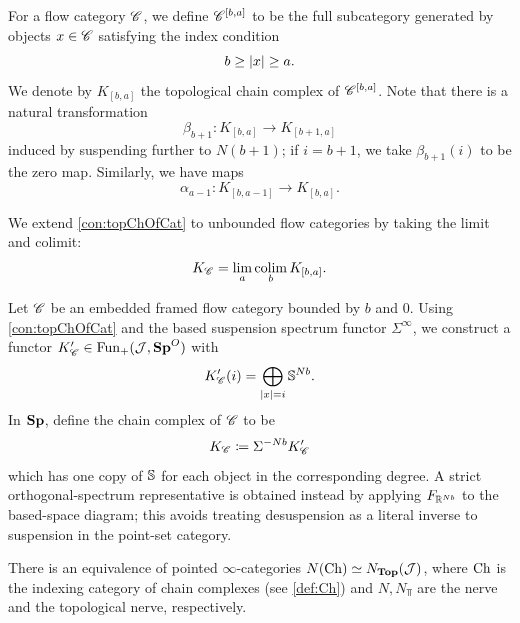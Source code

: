 For a flow category $\mathscr{C}$, we define $\mathscr{C}^{[b,a]}$ to be the full subcategory generated by objects $x \in \mathscr{C}$ satisfying the index condition
\begin{equation*}
    b \geq \left\lvert x\right\rvert \geq a.
\end{equation*}
We denote by $K_{[b,a]}$ the topological chain complex of $\mathscr{C}^{[b,a]}$. Note that there is a natural transformation
\begin{equation*}
    \beta_{b+1}:K_{[b,a]} \to K_{[b+1,a]}
\end{equation*}
induced by suspending further to $N(b+1)$; if $i=b+1$, we take $\beta_{b+1}(i)$ to be the zero map. Similarly, we have maps
\begin{equation*}
    \alpha_{a-1}:K_{[b,a-1]} \to K_{[b,a]}.
\end{equation*}

\begin{defn}\label{def:unbounded_K}
    We extend \cref{con:topChOfCat} to unbounded flow categories by taking the limit and colimit:
    \begin{equation*}
        K_{\mathscr{C}} = \lim_a \operatorname*{colim}_b K_{[b,a]}.
    \end{equation*}
\end{defn}

\begin{constr}\label{con:SpChOfCat}
    Let $\mathscr{C}$ be an embedded framed flow category bounded by $b$ and $0$. Using \cref{con:topChOfCat} and the based suspension spectrum functor $\Sigma^\infty$, we construct a functor $K_{\mathscr{C}}' \in \operatorname{Fun}_+(\mathcal{J},\mathbf{Sp}^O)$ with
    \begin{equation*}
        K_{\mathscr{C}}'(i) = \bigoplus_{\left\lvert x\right\rvert=i} \mathbb{S}^{Nb}.
    \end{equation*}
    In $\mathbf{Sp}$, define the chain complex of $\mathscr{C}$ to be
    \begin{equation*}
        K_{\mathscr{C}} \coloneqq \Sigma^{-Nb} K_{\mathscr{C}}'
    \end{equation*}
    which has one copy of $\mathbb{S}$ for each object in the corresponding degree. A strict orthogonal-spectrum representative is obtained instead by applying $F_{\mathbb{R}^{Nb}}$ to the based-space diagram; this avoids treating desuspension as a literal inverse to suspension in the point-set category.
\end{constr}

\begin{prop}\label{prop:J_equivalence}
There is an equivalence of pointed $\infty$-categories $N(\operatorname{Ch}) \simeq N_{\mathbf{Top}}(\mathcal{J})$, where $\operatorname{Ch}$ is the indexing category of chain complexes (see \cref{def:Ch}) and $N, N_{\Top}$ are the nerve and the topological nerve, respectively.
\end{prop}

